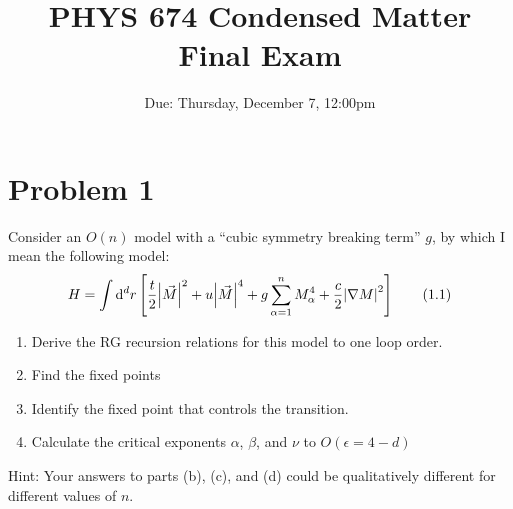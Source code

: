 \documentclass[12pt]{article}
\begin{document}
\title{PHYS 674 Condensed Matter \\ Final Exam}
\date{Due: Thursday, December 7, 12:00pm}
\maketitle

\section*{Problem 1}
Consider an $O(n)$ model with a ``cubic symmetry breaking term'' $g$, by which I mean the following model:
\begin{equation*}
    H = \int \dd^dr \left[\frac{t}{2}\abs{\vec{M}}^2 + u\abs{\vec{M}}^4 + g\sum_{\alpha=1}^n M_\alpha^4 + \frac{c}{2}\abs{\nabla M}^2\right]
    \tag{1.1}
\end{equation*}
\begin{enumerate}[label=(\alph*)]
    \item Derive the RG recursion relations for this model to one loop order.
    \item Find the fixed points
    \item Identify the fixed point that controls the transition.
    \item Calculate the critical exponents $\alpha$, $\beta$, and $\nu$ to $O(\epsilon = 4-d)$
\end{enumerate}
Hint: Your answers to parts (b), (c), and (d) could be qualitatively different for different values of $n$.
\end{document}
